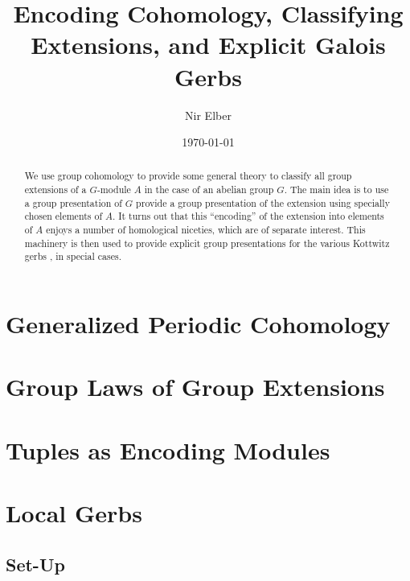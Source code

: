 \documentclass{article}
\title{Encoding Cohomology, Classifying Extensions, and Explicit Galois Gerbs}
\author{Nir Elber}
\date{\today}
\numberwithin{equation}{section}
\begin{document}
\maketitle

\begin{abstract}
	\noindent We use group cohomology to provide some general theory to classify all group extensions of a $ G$-module $A$ in the case of an abelian group $ G$. The main idea is to use a group presentation of $G$ provide a group presentation of the extension using specially chosen elements of $A$. It turns out that this ``encoding'' of the extension into elements of $A$ enjoys a number of homological niceties, which are of separate interest. This machinery is then used to provide explicit group presentations for the various Kottwitz gerbs \cite{kottwitz}, in special cases.
\end{abstract}

\setcounter{tocdepth}{4}
\tableofcontents

\section{Generalized Periodic Cohomology} \label{sec:crackpot}


\section{Group Laws of Group Extensions} \label{sec:general}




\section{Tuples as Encoding Modules} \label{sec:tuplestudy}


\section{Local Gerbs}
\subsection{Set-Up} \label{sec:setup}

\end{document}
